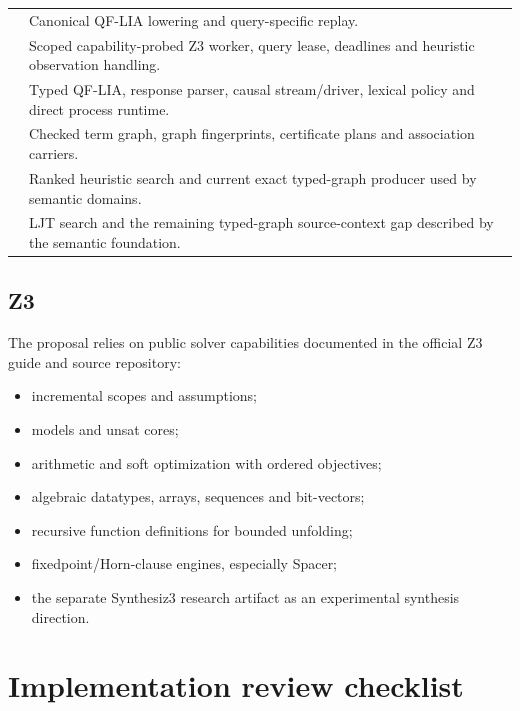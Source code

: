 \documentclass[11pt,oneside]{report}
\begin{document}
\begin{longtable}{@{}L{0.48\textwidth}L{0.46\textwidth}@{}}
 & Canonical QF-LIA lowering and query-specific replay. \\
 & Scoped capability-probed Z3 worker, query lease, deadlines and heuristic observation handling. \\
 & Typed QF-LIA, response parser, causal stream/driver, lexical policy and direct process runtime. \\
 & Checked term graph, graph fingerprints, certificate plans and association carriers. \\
 & Ranked heuristic search and current exact typed-graph producer used by semantic domains. \\
 & LJT search and the remaining typed-graph source-context gap described by the semantic foundation. \\
\end{longtable}

\section{Z3}

The proposal relies on public solver capabilities documented in the official Z3 guide and source repository:

\begin{itemize}[leftmargin=2em]
\item incremental scopes and assumptions;
\item models and unsat cores;
\item arithmetic and soft optimization with ordered objectives;
\item algebraic datatypes, arrays, sequences and bit-vectors;
\item recursive function definitions for bounded unfolding;
\item fixedpoint/Horn-clause engines, especially Spacer;
\item the separate Synthesiz3 research artifact as an experimental synthesis direction.
\end{itemize}

\chapter{Implementation review checklist}
\label{app:checklist}
\end{document}
